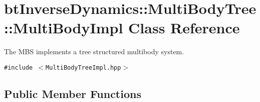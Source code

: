 \hypertarget{classbt_inverse_dynamics_1_1_multi_body_tree_1_1_multi_body_impl}{
\section{btInverseDynamics::MultiBodyTree::MultiBodyImpl Class Reference}
\label{classbt_inverse_dynamics_1_1_multi_body_tree_1_1_multi_body_impl}
}
The MBS implements a tree structured multibody system.  


{\tt \#include $<$MultiBodyTreeImpl.hpp$>$}

\subsection*{Public Member Functions}
